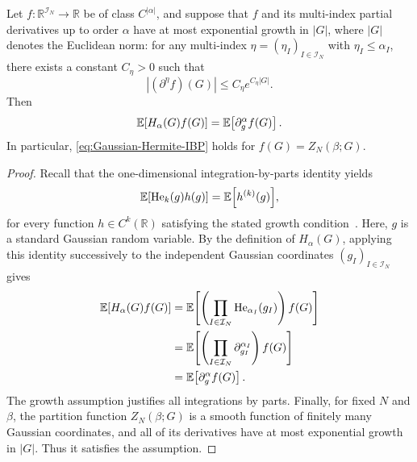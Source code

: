 \documentclass[../CLT_SYK.tex]{subfiles}
\begin{document}
\begin{lemma}\label{lem:Gaussian-Hermite-IBP}
Let $f\colon\mathbb R^{\mathcal I_N}\to\mathbb R$ be of class $C^{|\alpha|}$,
and suppose that $f$ and its multi-index partial derivatives up to order $\alpha$
have at most exponential growth in {$|G|$}{, where $|G|$ denotes the Euclidean norm}: for any multi-index $\eta=(\eta_I)_{I\in\mathcal I_N}$ with $\eta_I\leq \alpha_I$, there exists a  constant $C_\eta>0$ such that
\begin{equation*}
  |(\partial^\eta f)(G)| \leq {C_\eta e^{C_\eta |G|}}.
\end{equation*}
Then
\begin{equation}\label{eq:Gaussian-Hermite-IBP}
  \mathbb E\!\left[H_\alpha(G)f(G)\right]
  =\mathbb E\!\left[\partial_g^\alpha f(G)\right].
\end{equation}
In particular, \eqref{eq:Gaussian-Hermite-IBP} holds for
$f(G)=Z_N(\beta;G)$.
\end{lemma}
\begin{proof}
Recall that the one-dimensional integration-by-parts identity yields 
\[{
\mathbb E\!\left[\operatorname{He}_k(g)h(g)\right] = \mathbb E\!\left[h^{(k)}(g)\right]},
\]
for every function ${h}\in C^k(\mathbb R)$ satisfying the stated growth
condition~\cite[Equation~(2.3.15)]{S2023}. {Here, $g$ is a standard Gaussian random variable.} {By the definition of $H_\alpha(G)$, applying} this identity successively to the independent Gaussian
coordinates $(g_I)_{I\in\mathcal I_N}$ gives
\begin{align*}
\mathbb E\!\left[
H_\alpha(G)f(G)
\right]
&=
\mathbb E\!\left[
\left(
\prod_{I\in\mathcal I_N}
\operatorname{He}_{\alpha_I}(g_I)
\right)
f(G)
\right] \\
&=
\mathbb E\!\left[
\left(
\prod_{I\in\mathcal I_N}
\partial_{g_I}^{\alpha_I}
\right)
f(G)
\right] \\
&=
\mathbb E\!\left[
\partial_g^\alpha f(G)
\right].
\end{align*}
The growth assumption justifies all integrations by parts. Finally, for fixed
$N$ and $\beta$, the partition function $Z_N(\beta;G)$ is a smooth function
of finitely many Gaussian coordinates, and all of its derivatives have at
most exponential growth in  {$|G|$}.  
Thus it satisfies the assumption.
\end{proof}
\end{document}
